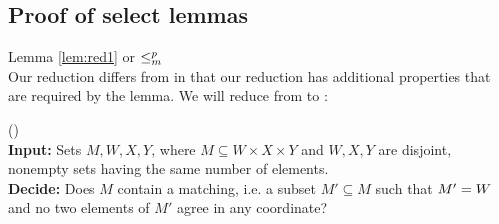\subsection{Proof of select lemmas}


\begin{claimproof}{Lemma \ref{lem:red1} or
                     $\le_m^p$ }\\
    Our reduction differs from \citet{bartholdiVoting}
    in that our reduction has additional properties that are required
    by the lemma.
    We will reduce from  to \dscore:

\begin{problem}{ ()}\\
    \tab \textbf{Input:} Sets $M,W,X,Y$, where $M\subseteq W \times
    X \times Y$ and $W,X,Y$ are disjoint, nonempty sets having the
    same number of elements.\\
    \tab \textbf{Decide:} Does $M$ contain a matching, i.e. a subset
    $M' \subseteq M$ such that $\mathnormal{M'} = \mathnormal{W}$
    and no two elements of $M'$ agree in any coordinate?
\end{problem}


\end{claimproof}

